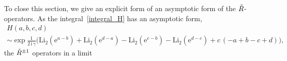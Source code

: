 \documentclass[12pt]{article}
\numberwithin{equation}{section}
\newcommand{\Li}{\mathrm{Li}_2}
\begin{document}
To close this section,
we give an explicit form of an asymptotic form of the
$\Check{R}$-operators.
As
the integral~\eqref{integral_H} has an asymptotic
form,
\begin{multline}
  H(a,b,c,d) \\
  \sim
  \exp \frac{1}{2 \, \mathrm{i} \, \gamma}
  \biggl(
  \Li(\mathrm{e}^{a-b}) + \Li(\mathrm{e}^{d-a})
  - \Li(\mathrm{e}^{c-b}) - \Li(\mathrm{e}^{d-c})
  + c\, ( -a + b - c + d)
  \biggr) ,
\end{multline}
the $\Check{R}^{\pm 1}$ operators  in a limit
\end{document}
